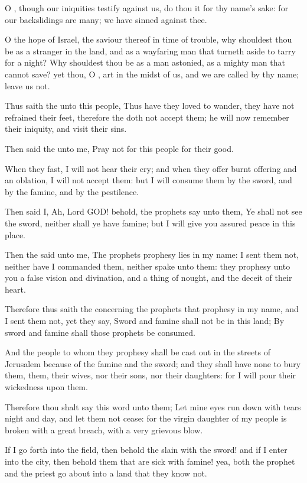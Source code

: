 \Verse O \LORD, though our iniquities testify against us, do thou it for thy name's sake: for our backslidings are many; we have sinned against thee.

\Verse O the hope of Israel, the saviour thereof in time of trouble, why shouldest thou be as a stranger in the land, and as a wayfaring man that turneth aside to tarry for a night?  \Verse Why shouldest thou be as a man astonied, as a mighty man that cannot save? yet thou, O \LORD, art in the midst of us, and we are called by thy name; leave us not.

\Verse Thus saith the \LORD unto this people, Thus have they loved to wander, they have not refrained their feet, therefore the \LORD doth not accept them; he will now remember their iniquity, and visit their sins.

\Verse Then said the \LORD unto me, Pray not for this people for their good.

\Verse When they fast, I will not hear their cry; and when they offer burnt offering and an oblation, I will not accept them: but I will consume them by the sword, and by the famine, and by the pestilence.

\Verse Then said I, Ah, Lord GOD! behold, the prophets say unto them, Ye shall not see the sword, neither shall ye have famine; but I will give you assured peace in this place.

\Verse Then the \LORD said unto me, The prophets prophesy lies in my name: I sent them not, neither have I commanded them, neither spake unto them: they prophesy unto you a false vision and divination, and a thing of nought, and the deceit of their heart.

\Verse Therefore thus saith the \LORD concerning the prophets that prophesy in my name, and I sent them not, yet they say, Sword and famine shall not be in this land; By sword and famine shall those prophets be consumed.

\Verse And the people to whom they prophesy shall be cast out in the streets of Jerusalem because of the famine and the sword; and they shall have none to bury them, them, their wives, nor their sons, nor their daughters: for I will pour their wickedness upon them.

\Verse Therefore thou shalt say this word unto them; Let mine eyes run down with tears night and day, and let them not cease: for the virgin daughter of my people is broken with a great breach, with a very grievous blow.

\Verse If I go forth into the field, then behold the slain with the sword!  and if I enter into the city, then behold them that are sick with famine!  yea, both the prophet and the priest go about into a land that they know not.

